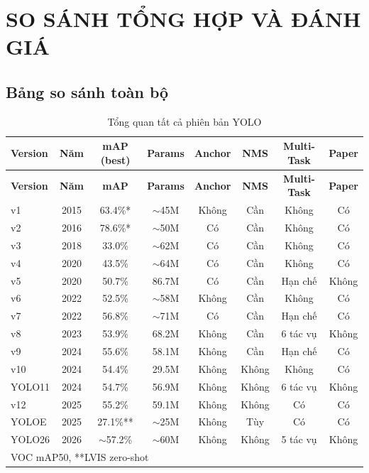 \chapter{SO SÁNH TỔNG HỢP VÀ ĐÁNH GIÁ}

\section{Bảng so sánh toàn bộ}

\begin{longtable}{lccccccc}
\caption{Tổng quan tất cả phiên bản YOLO} \\
\toprule
\textbf{Version} & \textbf{Năm} & \textbf{mAP (best)} & \textbf{Params} & \textbf{Anchor} & \textbf{NMS} & \textbf{Multi-Task} & \textbf{Paper} \\
\midrule
\endfirsthead
\toprule
\textbf{Version} & \textbf{Năm} & \textbf{mAP} & \textbf{Params} & \textbf{Anchor} & \textbf{NMS} & \textbf{Multi-Task} & \textbf{Paper} \\
\midrule
\endhead
v1 & 2015 & 63.4\%* & $\sim$45M & Không & Cần & Không & Có \\
v2 & 2016 & 78.6\%* & $\sim$50M & Có & Cần & Không & Có \\
v3 & 2018 & 33.0\% & $\sim$62M & Có & Cần & Không & Có \\
v4 & 2020 & 43.5\% & $\sim$64M & Có & Cần & Không & Có \\
v5 & 2020 & 50.7\% & 86.7M & Có & Cần & Hạn chế & Không \\
v6 & 2022 & 52.5\% & $\sim$58M & Không & Cần & Không & Có \\
v7 & 2022 & 56.8\% & $\sim$71M & Có & Cần & Hạn chế & Có \\
v8 & 2023 & 53.9\% & 68.2M & Không & Cần & 6 tác vụ & Không \\
v9 & 2024 & 55.6\% & 58.1M & Không & Cần & Hạn chế & Có \\
v10 & 2024 & 54.4\% & 29.5M & Không & Không & Không & Có \\
YOLO11 & 2024 & 54.7\% & 56.9M & Không & Không & 6 tác vụ & Không \\
v12 & 2025 & 55.2\% & 59.1M & Không & Không & Có & Có \\
YOLOE & 2025 & 27.1\%** & $\sim$25M & Không & Tùy & Có & Có \\
YOLO26 & 2026 & $\sim$57.2\% & $\sim$60M & Không & Không & 5 tác vụ & Không \\
\bottomrule
\multicolumn{8}{l}{\small *VOC mAP50, **LVIS zero-shot} \\
\end{longtable}

